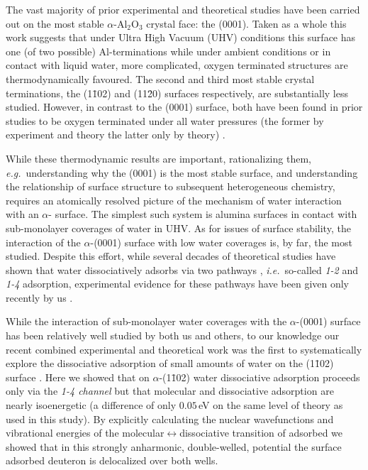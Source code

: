 \documentclass[twoside,twocolumn,9pt]{article}
\begin{document}
The vast majority of prior experimental and theoretical studies have been carried out on the most stable $\alpha$-Al$_{2}$O$_{3}$ crystal face: the (0001)\cite{hass98,nels98,toof98,hass00,Niu00,kelb07,Rane08,Rane09,zhan08,floe08,Wipp10,Wirth12,kirsch2014,tong2015optically}. Taken as a whole this work suggests that under Ultra High Vacuum (UHV) conditions this surface has one (of two possible) Al-terminations while under ambient conditions or in contact with liquid water, more complicated, oxygen terminated structures are thermodynamically favoured. The second and third most stable crystal terminations, the (1\=102) and (11\=20) surfaces respectively, are substantially less studied. However, in contrast to the (0001) surface, both have been found in prior studies to be oxygen terminated under all water pressures (the former by experiment and theory the latter only by theory) \cite{Trainor02,kuri10,Aboud11,Tougerti11,wirth2016characterization,becker104}.

While these thermodynamic results are important, rationalizing them, \textit{e.g.}\ understanding why the (0001) is the most stable surface, and understanding the relationship of surface structure to subsequent heterogeneous chemistry, requires an atomically resolved picture of the mechanism of water interaction with an $\alpha$- surface. The simplest such system is alumina surfaces in contact with sub-monolayer coverages of water in UHV. As for issues of surface stability, the interaction of the $\alpha$-(0001) surface with low water coverages is, by far, the most studied. Despite this effort, while several decades of theoretical studies have shown that water dissociatively adsorbs via two pathways \cite{hass98,hass00,Rane08,Rane09,This09,Wipp10,Wirth12}, \textit{i.e.}\ so-called \textit{1-2} and \textit{1-4} adsorption, 
experimental evidence for these pathways have been given only recently by us \cite{kirsch2014}.

While the interaction of sub-monolayer water coverages with the $\alpha$-(0001) surface has been relatively well studied by both us and others, to our knowledge our recent combined experimental and theoretical work was the first to systematically explore the dissociative adsorption of small amounts of water on the (1\=102) surface \cite{wirth2016characterization}. Here we showed that on $\alpha$-(1\=102) water dissociative adsorption proceeds only via the \textit{1-4 channel} but that molecular and dissociative adsorption are nearly isoenergetic (a difference of only $0.05\,$eV on the same level of theory as used in this study). By explicitly calculating the nuclear wavefunctions and vibrational energies of the molecular$\leftrightarrow$dissociative transition of adsorbed  we showed that in this strongly anharmonic, double-welled, potential the surface adsorbed deuteron is delocalized over both wells.
\end{document}
